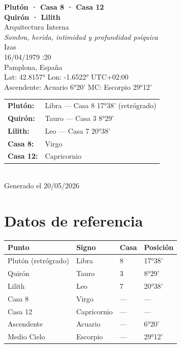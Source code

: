 \documentclass[11pt,a4paper]{article}
\begin{document}
\begin{titlepage}
  \centering
  \vspace*{1.5cm}
  {\Huge\bfseries\color{azulai} Plutón · Casa 8 · Casa 12}\\[0.35cm]
  {\Huge\bfseries\color{azulai} Quirón · Lilith}\\[0.5cm]
  {\large\color{grisai} Arquitectura Interna}\\[0.3cm]
  {\small\itshape\color{grisai} Sombra, herida, intimidad y profundidad psíquica}\\[2cm]
  {\huge\color{doradoai} Izas}\\[1.5cm]
  {\Large 16/04/1979 :20}\\[0.3cm]
  {\Large Pamplona, España}\\[0.3cm]
  {\normalsize Lat: 42.8157° \quad Lon: -1.6522° \quad UTC+02:00}\\[0.3cm]
  {\normalsize Ascendente: Acuario 6°20' \quad
    MC: Escorpio 29°12'}\\[2cm]

  \begin{tabular}{ll}
    \textbf{Plutón:}  & Libra — Casa 8 17°38' (retrógrado) \\
    \textbf{Quirón:}  & Tauro — Casa 3 8°29' \\
    \textbf{Lilith:}  & Leo — Casa 7 20°38' \\
    \textbf{Casa 8:}  & Virgo \\
    \textbf{Casa 12:} & Capricornio \\
  \end{tabular}\\[2cm]

  \vfill
  {\small Generado el 20/05/2026}
\end{titlepage}

\tableofcontents
\newpage

\section{Datos de referencia}

\begin{center}
\begin{tabular}{llll}
  \toprule
  \textbf{Punto} & \textbf{Signo} & \textbf{Casa} & \textbf{Posición} \\
  \midrule
  Plutón (retrógrado) & Libra & 8 & 17°38' \\
  Quirón & Tauro & 3 & 8°29' \\
  Lilith          & Leo & 7 & 20°38' \\
  Casa 8          & Virgo             & ---                  & --- \\
  Casa 12         & Capricornio            & ---                  & --- \\
  Ascendente      & Acuario         & ---                  & 6°20' \\
  Medio Cielo     & Escorpio          & ---                  & 29°12' \\
  \bottomrule
\end{tabular}
\end{center}
\end{document}
